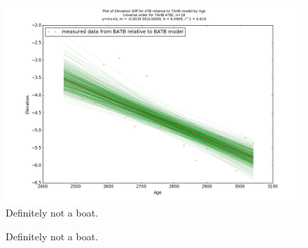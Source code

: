 \begin{figure}[h]
	\includegraphics[width=\linewidth]{data/gias/theGIA_ATB_relative_to_TAHB.png}
	\caption{Definitely not a boat.}
	\label{fig:gias_ATBxTAHB}
\end{figure}
\newpage






\begin{figure}[h]
	\caption{Definitely not a boat.}
	\label{fig:data_GTBxBATB}
\end{figure}
\newpage

